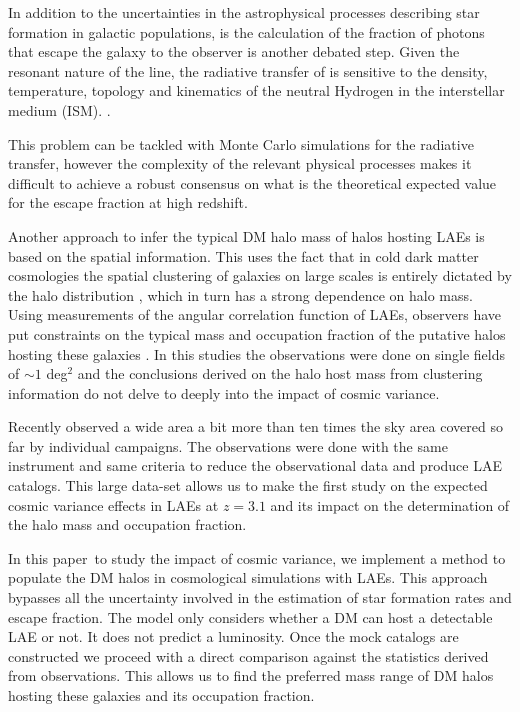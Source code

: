 \documentclass[usenatbib]{mn2e}
\newcommand{\documentname}{paper~}
\newcommand{\ly}{{\ifmmode{{\rm Ly}\alpha}\else{Ly$\alpha$~}\fi}}
\begin{document}
In addition to the uncertainties in the astrophysical processes
describing star formation in galactic populations, is the calculation
of the fraction of \ly photons that escape the galaxy to the observer
is another debated step. Given the resonant nature of the \ly line,
the radiative transfer of \ly is sensitive to the density,
temperature, topology and kinematics of the neutral Hydrogen in the
interstellar medium
(ISM). \citep{Neufeld1991,ForeroRomero2011,Dijkstra2012,Laursen2013,Orsi2012}.   

This problem can be tackled with Monte Carlo simulations for the
radiative transfer, however the complexity of the relevant physical
processes makes it difficult to achieve a robust consensus on what is
the theoretical expected value for the \ly escape fraction
at high redshift. 

Another approach to infer the typical DM halo mass of halos hosting
LAEs is based on the spatial information. This uses the fact that in cold
dark matter cosmologies the spatial clustering of galaxies on large
scales is entirely dictated by the halo distribution
\citep{Colberg00}, which in turn has a strong dependence on halo
mass. Using measurements of the angular correlation function of LAEs,
observers have put constraints on the typical mass and occupation
fraction of the putative halos hosting these galaxies
\citep{Hayashino2004,Gawiser07,Nilsson2007,Ouchi2010}. In this
studies the observations were done on single fields of $\sim 1$
deg$^{2}$ and the conclusions derived on the halo host mass from
clustering information do not delve to deeply into the impact of
cosmic variance.

Recently \cite{Yamada2012} observed a wide area a bit more than ten
times the sky area covered so far by individual campaigns. The
observations were done with the same instrument and same criteria to
reduce the observational data and produce LAE catalogs. This large
data-set allows us to make the first study on the expected cosmic
variance effects in LAEs at $z=3.1$ and its impact on the
determination of the halo mass and occupation fraction. 


In this \documentname to study the impact of cosmic variance,
we implement a method to populate the DM halos in cosmological
simulations with LAEs. This approach bypasses all the uncertainty
involved in the estimation of star formation rates and \ly escape
fraction. The model only considers whether a DM can host a
detectable LAE or not. It does not predict a \ly  luminosity. Once the
mock catalogs are constructed  we proceed with a direct comparison
against the statistics derived from observations. This allows us 
to find the preferred mass range of DM halos hosting these galaxies
and its occupation fraction.
\end{document}
